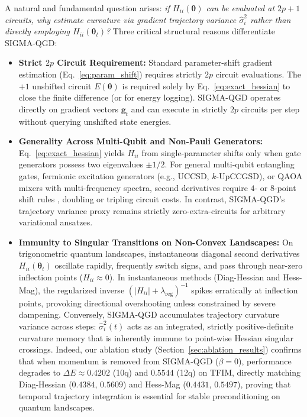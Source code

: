 \documentclass[11pt,a4paper]{article}
\begin{document}
A natural and fundamental question arises: \emph{if $H_{ii}(\boldsymbol{\theta})$ can be evaluated at $2p+1$ circuits, why estimate curvature via gradient trajectory variance $\hat{\sigma}_i^2$ rather than directly employing $H_{ii}(\boldsymbol{\theta}_t)$?} Three critical structural reasons differentiate SIGMA-QGD:
\begin{itemize}
    \item \textbf{Strict $2p$ Circuit Requirement:} Standard parameter-shift gradient estimation (Eq.~\eqref{eq:param_shift}) requires strictly $2p$ circuit evaluations. The $+1$ unshifted circuit $E(\boldsymbol{\theta})$ is required solely by Eq.~\eqref{eq:exact_hessian} to close the finite difference (or for energy logging). SIGMA-QGD operates directly on gradient vectors $\mathbf{g}_t$ and can execute in strictly $2p$ circuits per step without querying unshifted state energies.
    \item \textbf{Generality Across Multi-Qubit and Non-Pauli Generators:} Eq.~\eqref{eq:exact_hessian} yields $H_{ii}$ from single-parameter shifts only when gate generators possess two eigenvalues $\pm 1/2$. For general multi-qubit entangling gates, fermionic excitation generators (e.g., UCCSD, $k$-UpCCGSD), or QAOA mixers with multi-frequency spectra, second derivatives require $4$- or $8$-point shift rules \cite{wierichs2022general}, doubling or tripling circuit costs. In contrast, SIGMA-QGD's trajectory variance proxy remains strictly zero-extra-circuits for arbitrary variational ansatzes.
    \item \textbf{Immunity to Singular Transitions on Non-Convex Landscapes:} On trigonometric quantum landscapes, instantaneous diagonal second derivatives $H_{ii}(\boldsymbol{\theta}_t)$ oscillate rapidly, frequently switch signs, and pass through near-zero inflection points ($H_{ii} \approx 0$). In instantaneous methods (Diag-Hessian and Hess-Mag), the regularized inverse $(|H_{ii}| + \lambda_{\text{reg}})^{-1}$ spikes erratically at inflection points, provoking directional overshooting unless constrained by severe dampening. Conversely, SIGMA-QGD accumulates trajectory curvature variance across steps: $\hat{\sigma}_i^2(t)$ acts as an integrated, strictly positive-definite curvature memory that is inherently immune to point-wise Hessian singular crossings. Indeed, our ablation study (Section~\ref{sec:ablation_results}) confirms that when momentum is removed from SIGMA-QGD ($\beta=0$), performance degrades to $\Delta E \approx 0.4202$ (10q) and $0.5544$ (12q) on TFIM, directly matching Diag-Hessian ($0.4384$, $0.5609$) and Hess-Mag ($0.4431$, $0.5497$), proving that temporal trajectory integration is essential for stable preconditioning on quantum landscapes.
\end{itemize}
\end{document}
